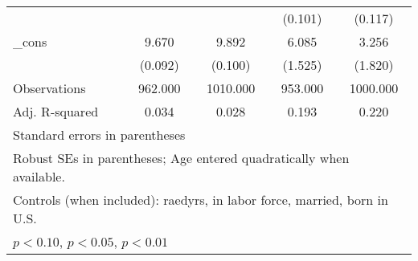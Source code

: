 \begin{table}[htbp]
\begin{tabular}{l*{4}{c}}
          &                  &                  &  (0.101)         &  (0.117)         \\
\_cons    &    9.670\sym{***}&    9.892\sym{***}&    6.085\sym{***}&    3.256\sym{*}  \\
          &  (0.092)         &  (0.100)         &  (1.525)         &  (1.820)         \\
\midrule
Observations&  962.000         & 1010.000         &  953.000         & 1000.000         \\
Adj. R-squared&    0.034         &    0.028         &    0.193         &    0.220         \\
\bottomrule
\multicolumn{5}{l}{\footnotesize Standard errors in parentheses}\\
\multicolumn{5}{l}{\footnotesize Robust SEs in parentheses; Age entered quadratically when available.}\\
\multicolumn{5}{l}{\footnotesize Controls (when included): raedyrs, in labor force, married, born in U.S.}\\
\multicolumn{5}{l}{\footnotesize \sym{*} \(p<0.10\), \sym{**} \(p<0.05\), \sym{***} \(p<0.01\)}\\
\end{tabular}
\end{table}
